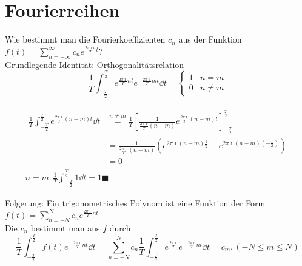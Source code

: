 \section{Fourierreihen}
Wie bestimmt man die Fourierkoeffizienten $c_n$ aus der Funktion $f(t) = \sum_{n = -\infty}^\infty c_n e^{\frac{2\pi\imath n}{T} t}$? \\
Grundlegende Identität: Orthogonalitätsrelation
\[ \frac{1}{T} \int_{-\frac{T}{2}}^{\frac{T}{2}} e^{\frac{2\pi\imath}{T} nt} e^{-\frac{2\pi\imath}{T} mt} \dd t = \begin{cases}
	1	&n = m	\\
	0	&n \neq m	
\end{cases} \]
\begin{bew}
	\begin{gather*}
		\begin{split}
			\frac{1}{T} \int_{-\frac{T}{2}}^{\frac{T}{2}} e^{\frac{2\pi\imath}{T} (n-m)t} \dd t
				&\overset{n \neq m}{=} \frac{1}{T} \left[ \frac{1}{\frac{2\pi\imath}{T} (n-m)} e^{\frac{2\pi\imath}{T} (n-m)t} \right]_{-\frac{T}{2}}^{\frac{T}{2}} \\
				&= \frac{1}{\frac{2\pi\imath}{T} (n-m)} ( e^{2\pi\imath (n-m) \frac{1}{2}} - e^{2\pi\imath (n-m) (-\frac{1}{2})} ) \\
				&= 0
		\end{split} \\
		n = m : \frac{1}{T} \int_{-\frac{T}{2}}^{\frac{T}{2}} 1 \dd t = 1 \blacksquare
	\end{gather*}
\end{bew}
Folgerung: Ein trigonometrisches Polynom ist eine Funktion der Form $f(t) = \sum_{n = -N}^{N} c_n e^{\frac{2\pi\imath}{T} nt}$ \\
Die $c_n$ bestimmt man aus $f$ durch
\[ \frac{1}{T} \int_{-\frac{T}{2}}^{\frac{T}{2}} f(t) e^{-\frac{2\pi\imath}{T} nt} \dd t = \sum_{n = -N}^N c_n \frac{1}{T} \int_{-\frac{T}{2}}^{\frac{T}{2}} e^{\frac{2\pi\imath}{T}} e^{-\frac{2\pi\imath}{T} nt} \dd t = c_m , ( -N \leq m \leq N ) \]

